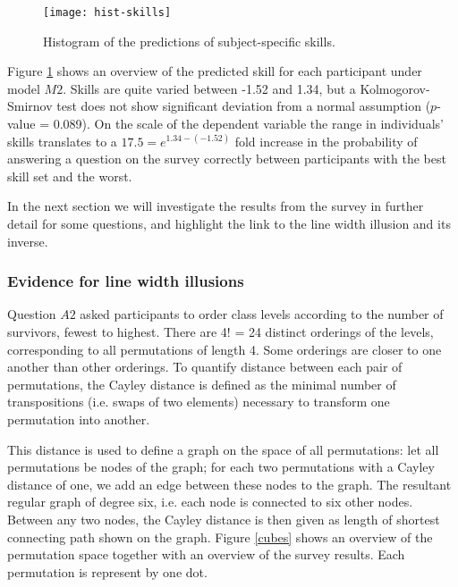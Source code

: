 \begin{figure}
\centering \texttt{[image: hist-skills]}
\caption{\label{skills}Histogram of the predictions of subject-specific skills. }
\vspace{-0.2in}
\end{figure}	
Figure \ref{skills} shows an overview of the predicted skill for each participant under model $M2$. Skills are quite varied between  -1.52 and  1.34, but
a Kolmogorov-Smirnov test  does not show significant deviation from a normal assumption ($p$-value = 0.089).
On the scale of the dependent variable the range in individuals' skills translates to a $17.5 = e^{1.34 - (-1.52)}$ fold increase in the probability of answering a question on the survey correctly between participants with the best skill set and the worst.

In the next section we will investigate the results from the survey in further detail for some questions, and highlight the link to the line width illusion and its inverse.

\subsubsection{Evidence for line width illusions}

Question $A2$ asked participants to order  class levels  according to the number of survivors, fewest to highest. There are 4! = 24 distinct orderings of the levels, corresponding to all permutations of length 4. Some orderings are closer to one another than other orderings.  To quantify distance between each pair of permutations, the Cayley distance is defined as the minimal number of transpositions (i.e. swaps of two elements) necessary to transform one permutation into another.

This distance is used to define a graph on the space of all permutations: let all permutations be nodes of the graph; for each two permutations with a Cayley distance of one, we add an edge between these nodes to the graph. The resultant regular graph of degree six, i.e. each  node is connected to six other nodes. Between any two nodes, the Cayley distance is then given as length of shortest connecting path shown on the graph.
Figure \ref{cubes} shows an overview of the permutation space together with an overview of the survey results. Each permutation is represent by one dot. 

